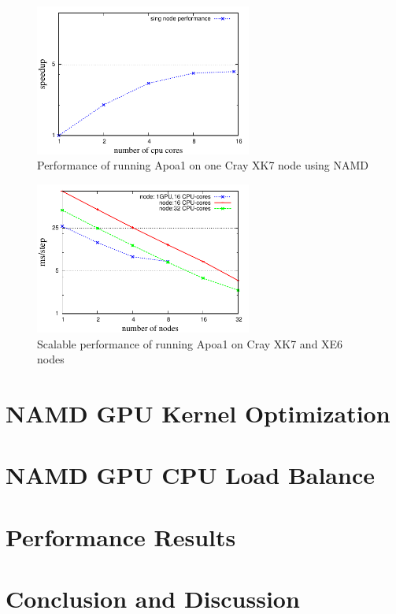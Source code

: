 \documentclass[11pt,onecolumn]{article}
\begin{document}
\begin{figure}[h]
\centering
\includegraphics[width=2.8in]{figs/gpu-singlenode}
\caption{Performance of running Apoa1 on one Cray XK7 node using NAMD}
\label{figs:apoa1-gpu-singlenode-JYC}
\vspace{-0.2cm}
\end{figure}

\begin{figure}[h]
\centering
\includegraphics[width=2.8in]{figs/cpu-gpu-jyc-apoa1}
\caption{Scalable performance of running Apoa1 on Cray XK7 and XE6 nodes }
\label{figs:apoa1-gpu-scale-JYC}
\vspace{-0.2cm}
\end{figure}



\section{NAMD GPU Kernel Optimization}


\section{NAMD GPU CPU Load Balance}


\section{Performance Results}


\section{Conclusion and Discussion}




\end{document}
